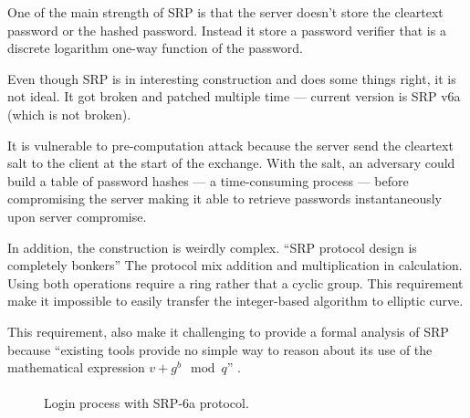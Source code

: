 \documentclass[../report.tex]{subfiles}
\begin{document}
One of the main strength of SRP is that the server doesn't store the cleartext password or the hashed password. Instead it store a password verifier that is a discrete logarithm one-way function of the password.


Even though SRP is in interesting construction and does some things right, it is not ideal.
It got broken and patched multiple time --- current version is SRP v6a (which is not broken). %

It is vulnerable to pre-computation attack because the server send the cleartext salt to the client at the start of the exchange. With the salt, an adversary could build a table of password hashes --- a time-consuming process --- before compromising the server making it able to retrieve passwords instantaneously upon server compromise.

In addition, the construction is weirdly complex. ``SRP protocol design is completely bonkers''
The protocol mix addition and multiplication in calculation. Using both operations require a ring rather that a cyclic group. This requirement make it impossible to easily transfer the integer-based algorithm to elliptic curve. %

This requirement, also make it challenging to provide a formal analysis of SRP because 
``existing tools provide no simple way to reason about its use of the mathematical expression $v+g^b \mod{q}$'' \cite{Formal Methods Analysis of the Secure Remote Password Protocol (2020)}. %


\paragraph{}


\begin{figure}[h]
 \centering

 \setlength{\fboxsep}{10pt}
 \setlength{\fboxrule}{1pt}

 \caption{Login process with SRP-6a protocol.}
 \label{fig:SRP}
\end{figure}
\end{document}
